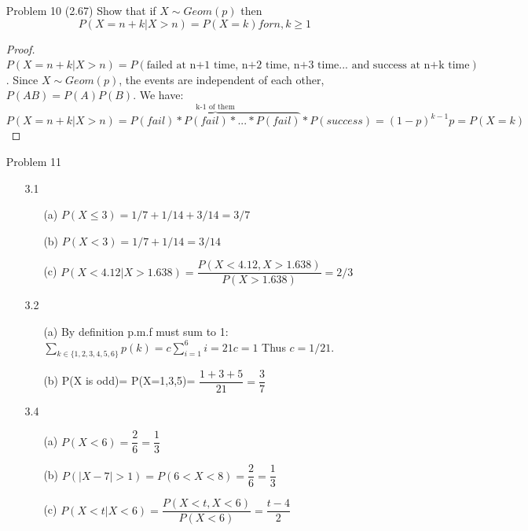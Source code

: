 \documentclass[11pt, oneside]{article}
\begin{document}
\begin{enumerate}
    \item[Problem 10] (2.67) Show that if $X\sim Geom(p)$ then 
    \[P(X=n+k |X>n)=P(X=k) for n,k \geq 1\]
    
    \begin{proof}
    
    $P(X=n+k |X>n)= P(\text{failed at n+1 time, n+2 time, n+3 time... and success at n+k time})$. Since $X\sim Geom(p)$, the events are independent of each other, $P(AB)=P(A)P(B)$. We have:
    \[P(X=n+k |X>n) = \overbrace{P(fail)*P(fail)*...*P(fail)}^\text{k-1 of them}*P(success)= (1-p)^{k-1}p=P(X=k) \]
    \end{proof}
    
    \item[Problem 11] 
    \begin{enumerate}
        \item[3.1]  
        \begin{enumerate}
            \item[(a)] $P(X\leq 3)=1/7+1/14+3/14=3/7$
            \item[(b)] $P(X< 3)=1/7+1/14=3/14$
            \item[(c)] $P(X< 4.12 | X>1.638)=\dfrac{P(X<4.12, X>1.638)}{P(X>1.638)}=2/3$
        \end{enumerate}
        \item[3.2]
        \begin{enumerate}
            \item[(a)] By definition p.m.f must sum to 1: $\sum_{k\in\{1,2,3,4,5,6\}}p(k)= c\sum_{i=1}^6 i= 21c=1$ Thus $c=1/21$.
            \item[(b)] P(X is odd)= P(X=1,3,5)= $\dfrac{1+3+5}{21}=\dfrac{3}{7}$
        \end{enumerate}
        \item[3.4]
        \begin{enumerate}
            \item[(a)] $P(X<6)=\dfrac{2}{6}=\dfrac{1}{3}$
            \item[(b)] $P(|X-7|>1)=P(6<X<8)=\dfrac{2}{6}=\dfrac{1}{3}$
            \item[(c)] $P(X<t | X<6)= \dfrac{P(X<t, X<6)}{P(X<6)}= \dfrac{t-4}{2} $
        \end{enumerate}
    \end{enumerate}
    \end{enumerate}
\end{document}
